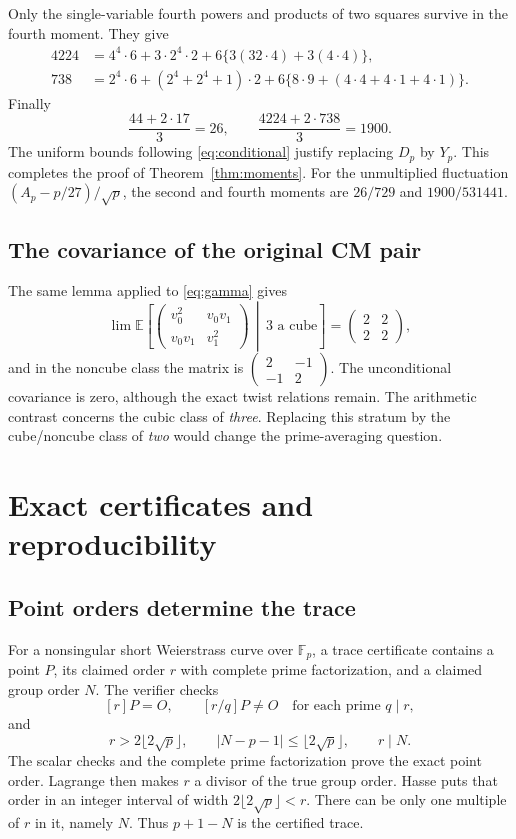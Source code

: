\documentclass[11pt]{article}
\theoremstyle{definition}\newtheorem{definition}[theorem]{Definition}
\newcommand{\Fp}{\mathbb F_p}
\newcommand{\E}{\mathbb E}
\begin{document}
Only the single-variable fourth powers and
products of two squares survive in the
fourth moment. They give
\begin{align*}
 4224&=4^4\cdot6+3\cdot2^4\cdot2
       +6\{3(32\cdot4)+3(4\cdot4)\},\\
 738&=2^4\cdot6+(2^4+2^4+1)\cdot2
       +6\{8\cdot9+(4\cdot4+4\cdot1+4\cdot1)\}.
\end{align*}
Finally
\[
 \frac{44+2\cdot17}{3}=26,\qquad
 \frac{4224+2\cdot738}{3}=1900.
\]
The uniform bounds following \eqref{eq:conditional}
justify replacing $D_p$ by $Y_p$.
This completes the proof of
Theorem~\ref{thm:moments}.
For the unmultiplied fluctuation
$(A_p-p/27)/\sqrt p$, the second and fourth
moments are $26/729$ and $1900/531441$.

\subsection{The covariance of the original CM pair}
The same lemma applied to \eqref{eq:gamma} gives
\[
 \lim\E\left[
 \begin{pmatrix}v_0^2&v_0v_1\\v_0v_1&v_1^2\end{pmatrix}
 \,\middle|\,3\text{ a cube}\right]
 =\begin{pmatrix}2&2\\2&2\end{pmatrix},
\]
and in the noncube class the matrix is
$\left(\begin{smallmatrix}2&-1\\-1&2\end{smallmatrix}\right)$.
The unconditional covariance is zero,
although the exact twist relations remain.
The arithmetic contrast concerns the cubic
class of \emph{three}. Replacing this stratum by the cube/noncube
class of \emph{two} would change the prime-averaging question.

\section{Exact certificates and reproducibility}\label{sec:certificates}
\subsection{Point orders determine the trace}
For a nonsingular short Weierstrass curve over
$\Fp$, a trace certificate contains a point $P$,
its claimed order $r$ with complete prime
factorization, and a claimed group order $N$.
The verifier checks
\[
 [r]P=O,\qquad [r/q]P\ne O
 \quad\text{for each prime }q\mid r,
\]
and
\begin{equation}\label{eq:hasse-certificate}
 r>2\lfloor2\sqrt p\rfloor,\qquad
 |N-p-1|\le\lfloor2\sqrt p\rfloor,\qquad r\mid N.
\end{equation}
The scalar checks and the complete prime
factorization prove the exact point order.
Lagrange then makes $r$ a divisor of the
true group order. Hasse puts that order
in an integer interval of width
$2\lfloor2\sqrt p\rfloor<r$. There can be
only one multiple of $r$ in it, namely $N$.
Thus $p+1-N$ is the certified trace.
\end{document}
